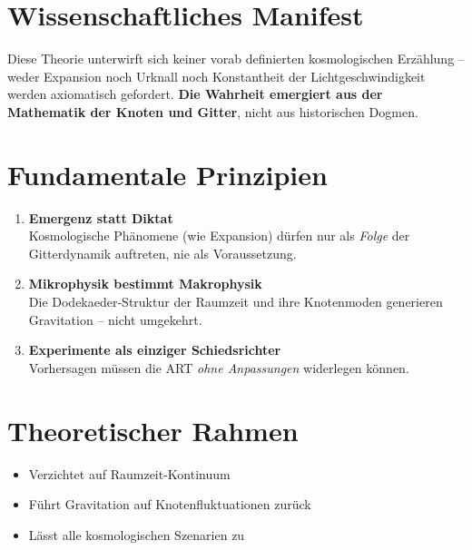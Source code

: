 \section*{Wissenschaftliches Manifest}
Diese Theorie unterwirft sich keiner vorab definierten kosmologischen Erzählung – weder Expansion noch Urknall noch Konstantheit der Lichtgeschwindigkeit werden axiomatisch gefordert. \textbf{Die Wahrheit emergiert aus der Mathematik der Knoten und Gitter}, nicht aus historischen Dogmen.

\section*{Fundamentale Prinzipien}
\begin{enumerate}
    \item \textbf{Emergenz statt Diktat} \\
    Kosmologische Phänomene (wie Expansion) dürfen nur als \emph{Folge} der Gitterdynamik auftreten, nie als Voraussetzung.
    
    \item \textbf{Mikrophysik bestimmt Makrophysik} \\
    Die Dodekaeder-Struktur der Raumzeit und ihre Knotenmoden generieren Gravitation – nicht umgekehrt.
    
    \item \textbf{Experimente als einziger Schiedsrichter} \\
    Vorhersagen müssen die ART \emph{ohne Anpassungen} widerlegen können.
\end{enumerate}

\section*{Theoretischer Rahmen}
\begin{itemize}
    \item Verzichtet auf Raumzeit-Kontinuum
    \item Führt Gravitation auf Knotenfluktuationen zurück
    \item Lässt alle kosmologischen Szenarien zu
\end{itemize}

